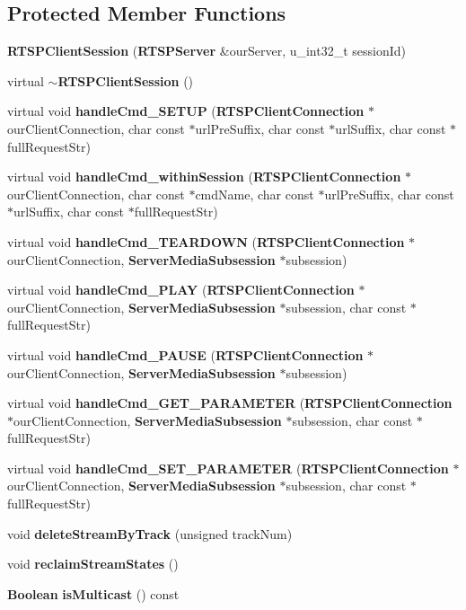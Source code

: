 \subsection*{Protected Member Functions}
\begin{DoxyCompactItemize}
\item 
{\bf R\+T\+S\+P\+Client\+Session} ({\bf R\+T\+S\+P\+Server} \&our\+Server, u\+\_\+int32\+\_\+t session\+Id)
\item 
virtual {\bf $\sim$\+R\+T\+S\+P\+Client\+Session} ()
\item 
virtual void {\bf handle\+Cmd\+\_\+\+S\+E\+T\+U\+P} ({\bf R\+T\+S\+P\+Client\+Connection} $\ast$our\+Client\+Connection, char const $\ast$url\+Pre\+Suffix, char const $\ast$url\+Suffix, char const $\ast$full\+Request\+Str)
\item 
virtual void {\bf handle\+Cmd\+\_\+within\+Session} ({\bf R\+T\+S\+P\+Client\+Connection} $\ast$our\+Client\+Connection, char const $\ast$cmd\+Name, char const $\ast$url\+Pre\+Suffix, char const $\ast$url\+Suffix, char const $\ast$full\+Request\+Str)
\item 
virtual void {\bf handle\+Cmd\+\_\+\+T\+E\+A\+R\+D\+O\+W\+N} ({\bf R\+T\+S\+P\+Client\+Connection} $\ast$our\+Client\+Connection, {\bf Server\+Media\+Subsession} $\ast$subsession)
\item 
virtual void {\bf handle\+Cmd\+\_\+\+P\+L\+A\+Y} ({\bf R\+T\+S\+P\+Client\+Connection} $\ast$our\+Client\+Connection, {\bf Server\+Media\+Subsession} $\ast$subsession, char const $\ast$full\+Request\+Str)
\item 
virtual void {\bf handle\+Cmd\+\_\+\+P\+A\+U\+S\+E} ({\bf R\+T\+S\+P\+Client\+Connection} $\ast$our\+Client\+Connection, {\bf Server\+Media\+Subsession} $\ast$subsession)
\item 
virtual void {\bf handle\+Cmd\+\_\+\+G\+E\+T\+\_\+\+P\+A\+R\+A\+M\+E\+T\+E\+R} ({\bf R\+T\+S\+P\+Client\+Connection} $\ast$our\+Client\+Connection, {\bf Server\+Media\+Subsession} $\ast$subsession, char const $\ast$full\+Request\+Str)
\item 
virtual void {\bf handle\+Cmd\+\_\+\+S\+E\+T\+\_\+\+P\+A\+R\+A\+M\+E\+T\+E\+R} ({\bf R\+T\+S\+P\+Client\+Connection} $\ast$our\+Client\+Connection, {\bf Server\+Media\+Subsession} $\ast$subsession, char const $\ast$full\+Request\+Str)
\item 
void {\bf delete\+Stream\+By\+Track} (unsigned track\+Num)
\item 
void {\bf reclaim\+Stream\+States} ()
\item 
{\bf Boolean} {\bf is\+Multicast} () const 

\end{DoxyCompactItemize}

